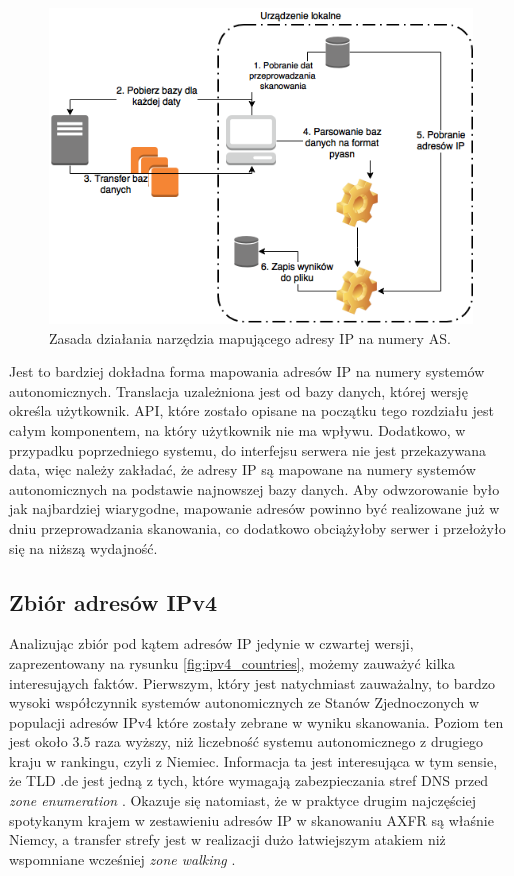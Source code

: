 \begin{figure}[h]
	\centering
	\includegraphics[width=1.0\textwidth]{image/netcat}
	\caption{Zasada działania narzędzia mapującego adresy IP na numery AS.}
	\label{fig:netcat}
\end{figure}

Jest to bardziej dokładna forma mapowania adresów IP na numery
systemów autonomicznych. Translacja uzależniona jest od bazy danych, której wersję określa użytkownik. API, które zostało opisane
na początku tego rozdziału jest całym komponentem, na który użytkownik nie ma wpływu. Dodatkowo, w przypadku poprzedniego systemu,
do interfejsu serwera nie jest przekazywana data, więc należy zakładać, że adresy IP są mapowane na numery systemów autonomicznych
na podstawie najnowszej bazy danych. Aby odwzorowanie było jak najbardziej wiarygodne, mapowanie adresów powinno być realizowane
już w dniu przeprowadzania skanowania, co dodatkowo obciążyłoby serwer i przełożyło się na niższą wydajność.

\subsection{Zbiór adresów IPv4}
\label{sec:ipv4_results}
Analizując zbiór pod kątem adresów IP jedynie w czwartej wersji, zaprezentowany na rysunku \ref{fig:ipv4_countries}, możemy
zauważyć kilka interesująych faktów. Pierwszym, który jest natychmiast zauważalny, to bardzo wysoki współczynnik systemów autonomicznych
ze Stanów Zjednoczonych w populacji adresów IPv4 które zostały zebrane w wyniku skanowania. Poziom ten jest około 3.5 raza wyższy,
niż liczebność systemu autonomicznego z drugiego kraju w rankingu, czyli z Niemiec. Informacja ta jest interesująca w tym sensie, że
TLD .de jest jedną z tych, które wymagają zabezpieczania stref DNS przed \textit{zone enumeration} \cite{euLaw, zoneEnumeration}.
Okazuje się natomiast,
że w praktyce drugim najczęściej spotykanym krajem w zestawieniu adresów IP w skanowaniu AXFR są właśnie Niemcy, a transfer strefy
jest w realizacji dużo łatwiejszym atakiem niż wspomniane wcześniej \textit{zone walking} \label{zone_enumeration}.

